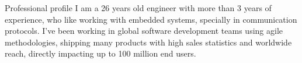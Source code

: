 \documentclass[
	11pt, %
]{resume} %
\begin{document}
	
\begin{rSection}{Professional profile}
\justifying
I am a 26 years old engineer with more than 3 years of experience, who like working with embedded systems, specially in communication protocols. I've been working in global software development teams using agile methodologies, shipping many products with high sales statistics and worldwide reach, directly impacting up to 100 million end users. %
	
	
\end{rSection}

\end{document}
